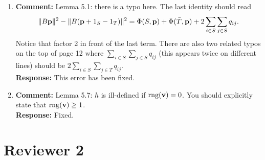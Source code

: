\documentclass[a4paper,10pt]{article}
\begin{document}
\begin{enumerate}

\item\textbf{Comment:} 
Lemma 5.1: there is a typo here.  The last identity should read
\[
\|B\mathbf{p}\|^2 - \|B(\mathbf{p} + 1_S - 1_T)\|^2 = \Phi(S,\mathbf{p}) + \Phi(\bar{T}, \mathbf{p}) + 2\sum_{i \in S}\sum_{j\in S} q_{ij}.
\]
Notice that factor 2 in front of the last term.  There are also two related typos on the top of page 12 where $\sum_{i \in S}\sum_{j\in S} q_{ij}$ (this appears twice on different lines) should be $2\sum_{i \in S}\sum_{j\in T} q_{ij}$.
\\\textbf{Response:}
This error has been fixed.


\item\textbf{Comment:} 
Lemma 5.7: $h$ is ill-defined if $\operatorname{rng}(\mathbf{v}) = 0$.  You should explicitly state that $\operatorname{rng}(\mathbf{v}) \geq 1$.
\\\textbf{Response:}
Fixed.


\end{enumerate}


\section*{Reviewer 2}\label{sec:reviewer-2}
\end{document}
